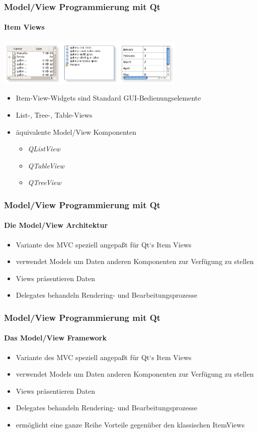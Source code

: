 \begin{frame}
	\frametitle{Model/View Programmierung mit Qt}
	\framesubtitle{Item Views}
	\begin{center}
		\includegraphics[width=9cm]{../mvc/qt-widgets.png}
	\end{center}
	\begin{itemize}
		\item Item-View-Widgets sind Standard GUI-Bedienungselemente
		\item List-, Tree-, Table-Views
		\item äquivalente Model/View Komponenten
		\begin{itemize}
			\item {\itshape QListView}
			\item {\itshape QTableView}
			\item {\itshape QTreeView}
		\end{itemize}
	\end{itemize}
\end{frame}

\begin{frame}
	\frametitle{Model/View Programmierung mit Qt}
	\framesubtitle{Die Model/View Architektur}
	\begin{itemize}
		\item Variante des MVC speziell angepaßt für Qt`s Item Views
		\item verwendet Models um Daten anderen Komponenten zur Verfügung zu stellen
		\item Views präsentieren Daten
		\item Delegates behandeln Rendering- und Bearbeitungsprozesse
	\end{itemize}
\end{frame}

\begin{frame}
	\frametitle{Model/View Programmierung mit Qt}
	\framesubtitle{Das Model/View Framework}
	\begin{itemize}
		\item Variante des MVC speziell angepaßt für Qt`s Item Views
		\item verwendet Models um Daten anderen Komponenten zur Verfügung zu stellen
		\item Views präsentieren Daten
		\item Delegates behandeln Rendering- und Bearbeitungsprozesse
		\item ermöglicht eine ganze Reihe Vorteile gegenüber den klassischen ItemViews
	\end{itemize}
\end{frame}

